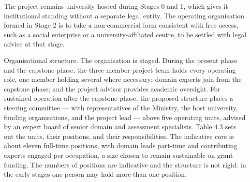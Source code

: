 The project remains university-hosted during Stages 0 and 1, which gives it institutional standing without a separate legal entity. The operating organisation formed in Stage 2 is to take a non-commercial form consistent with free access, such as a social enterprise or a university-affiliated centre, to be settled with legal advice at that stage.

Organisational structure. The organisation is staged. During the present phase and the capstone phase, the three-member project team holds every operating role, one member holding several where necessary; domain experts join from the capstone phase; and the project advisor provides academic oversight. For sustained operation after the capstone phase, the proposed structure places a steering committee --- with representatives of the Ministry, the host university, funding organisations, and the project lead --- above five operating units, advised by an expert board of senior domain and assessment specialists. Table 4.3 sets out the units, their positions, and their responsibilities. The indicative core is about eleven full-time positions, with domain leads part-time and contributing experts engaged per occupation, a size chosen to remain sustainable on grant funding. The numbers of positions are indicative and the structure is not rigid: in the early stages one person may hold more than one position.

